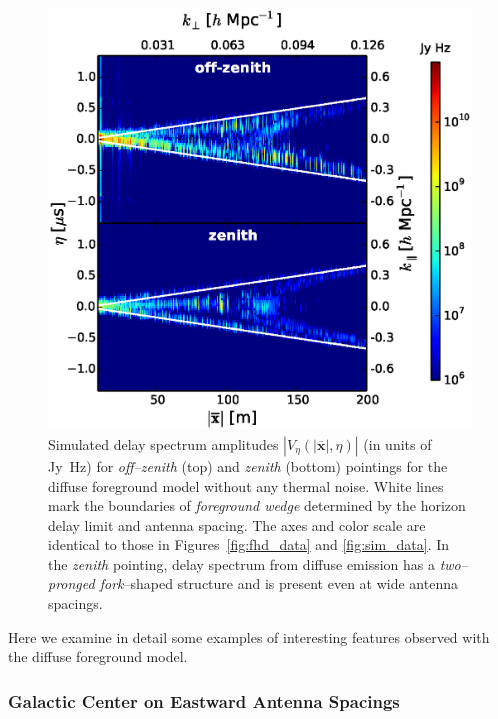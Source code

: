 \documentclass[preprint2,iop,numberedappendix]{emulateapj}
\begin{document}
\begin{figure}[htb]
\centering
\includegraphics[width=\linewidth]{figures/v1_0/delta_array_multi_baseline_CLEAN_noiseless_visibilities_0.3m_ground_custom_gaussian_FG_model_dsm_all_sky_nside_64_Tsys_95.0K_185.0_MHz_30.7_MHz_bhw2.0.eps}
\caption{Simulated delay spectrum amplitudes $|V_\eta(|\overline{\mathbf{x}}|,\eta)|$ (in units of Jy~Hz) for {\it off--zenith} (top) and {\it zenith} (bottom) pointings for the diffuse foreground model without any thermal noise. White lines mark the boundaries of {\it foreground wedge} determined by the horizon delay limit and antenna spacing. The axes and color scale are identical to those in Figures~\ref{fig:fhd_data} and \ref{fig:sim_data}. In the {\it zenith} pointing, delay spectrum from diffuse emission has a {\it two--pronged fork}--shaped structure and is present even at wide antenna spacings. \label{fig:noiseless-dsm-delay-spectrum}}
\end{figure}

Here we examine in detail some examples of interesting features observed with the diffuse foreground model.

\subsubsection{Galactic Center on Eastward Antenna Spacings}\label{sec:GC-east}
\end{document}

